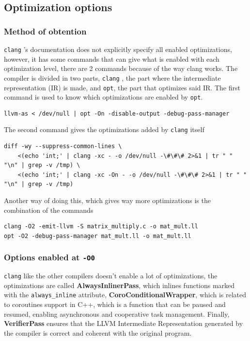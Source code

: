 \documentclass{rapport}
\newcommand{\clang}{\texttt{clang} }
\newcommand{\optizero}{\texttt{-O0} }
\begin{document}
\subsection{Optimization options}
\subsubsection{Method of obtention}
\clang's documentation does not explicitly specify all enabled optimizations, however, it has some commands that can give what is enabled with each 
optimization level, there are 2 commands because of the way clang works. \newline
The compiler is divided in two parts, \clang, the part where the intermediate representation (IR) is made, and \texttt{opt}, the part that optimizes said IR. 
The first command is used to know which optimizations are enabled by \texttt{opt}.
\begin{verbatim}
llvm-as < /dev/null | opt -On -disable-output -debug-pass-manager
\end{verbatim}
The second command gives the optimizations added by \clang itself
\begin{verbatim}
diff -wy --suppress-common-lines \
    <(echo 'int;' | clang -xc - -o /dev/null -\#\#\# 2>&1 | tr " " "\n" | grep -v /tmp) \
    <(echo 'int;' | clang -xc -On - -o /dev/null -\#\#\# 2>&1 | tr " " "\n" | grep -v /tmp)
\end{verbatim}
Another way of doing this, which gives way more optimizations is the combination of the commands 
\begin{verbatim}
clang -O2 -emit-llvm -S matrix_multiply.c -o mat_mult.ll
opt -O2 -debug-pass-manager mat_mult.ll -o mat_mult.ll
\end{verbatim}

\subsubsection{Options enabled at \optizero}
\clang like the other compilers doesn't enable a lot of optimizations, the optimizations are called \textbf{AlwaysInlinerPass}, which inlines functions marked
with the \texttt{always\_inline} attribute, \textbf{CoroConditionalWrapper}, which is related to coroutines support in C++, which is a function that can be 
paused and resumed, enabling asynchronous and cooperative task management. Finally, \textbf{VerifierPass} ensures that the LLVM Intermediate Representation 
generated by the compiler is correct and coherent with the original program.
\end{document}
